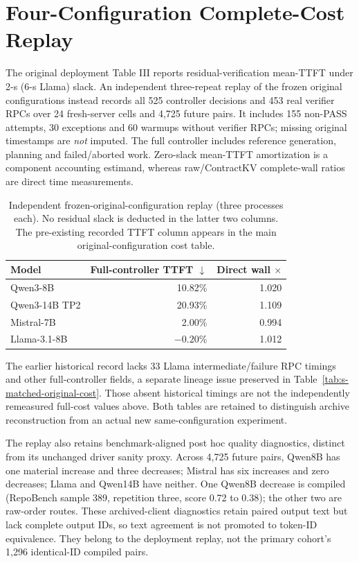 \section{Four-Configuration Complete-Cost Replay}
\label{sec:s-f1-replay}
The original deployment Table III reports residual-verification mean-TTFT under 2-s (6-s Llama) slack. An independent three-repeat replay of the frozen original configurations instead records all 525 controller decisions and 453 real verifier RPCs over 24 fresh-server cells and 4,725 future pairs. It includes 155 non-PASS attempts, 30 exceptions and 60 warmups without verifier RPCs; missing original timestamps are \emph{not} imputed. The full controller includes reference generation, planning and failed/aborted work. Zero-slack mean-TTFT amortization is a component accounting estimand, whereas raw/ContractKV complete-wall ratios are direct time measurements.
\begin{table}[t]
\centering\small
\caption{Independent frozen-original-configuration replay (three processes each). No residual slack is deducted in the latter two columns. The pre-existing recorded TTFT column appears in the main original-configuration cost table.}
\label{tab:s-f1-replay}
\begin{tabular}{@{}lrr@{}}
\toprule
Model & Full-controller TTFT $\downarrow$ & Direct wall $\times$\\
\midrule
Qwen3-8B & 10.82\% & 1.020\\
Qwen3-14B TP2 & 20.93\% & 1.109\\
Mistral-7B & 2.00\% & 0.994\\
Llama-3.1-8B & $-0.20$\% & 1.012\\
\bottomrule
\end{tabular}
\end{table}

The earlier historical record lacks 33 Llama intermediate/failure RPC timings and other full-controller fields, a separate lineage issue preserved in Table~\ref{tab:s-matched-original-cost}. Those absent historical timings are not the independently remeasured full-cost values above. Both tables are retained to distinguish archive reconstruction from an actual new same-configuration experiment.


The replay also retains benchmark-aligned post hoc quality diagnostics, distinct from its unchanged driver sanity proxy. Across 4,725 future pairs, Qwen8B has one material increase and three decreases; Mistral has six increases and zero decreases; Llama and Qwen14B have neither. One Qwen8B decrease is compiled (RepoBench sample 389, repetition three, score 0.72 to 0.38); the other two are raw-order routes. These archived-client diagnostics retain paired output text but lack complete output IDs, so text agreement is not promoted to token-ID equivalence. They belong to the deployment replay, not the primary cohort's 1,296 identical-ID compiled pairs.
